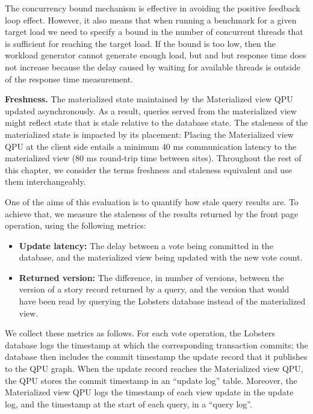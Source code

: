 The concurrency bound mechanism is effective in avoiding the positive feedback loop effect.
However, it also means that when running a benchmark for a given target load we need to specify a bound in the number of
concurrent threads that is sufficient for reaching the target load.
If the bound is too low, then the workload generator cannot generate enough load, but and but response time does not
increase because the delay caused by waiting for available threads is outside of the response time measurement.

\bigskip
\noindent
\textbf{Freshness.} The materialized state maintained by the Materialized view QPU updated asynchronously.
As a result, queries served from the materialized view might reflect state that is stale relative to the database state.
The staleness of the materialized state is impacted by its placement:
Placing the Materialized view QPU at the client side entails a minimum 40 ms communication latency to the materialized view
(80 ms round-trip time between sites).
Throughout the rest of this chapter, we consider the terms freshness and staleness equivalent and use them interchangeably.

One of the aims of this evaluation is to quantify how stale query results are.
To achieve that, we measure the staleness of the results returned by the front page operation,
using the following metrics:
\begin{itemize}
  \item \textbf{Update latency:} The delay between a vote being committed in the database, and the materialized view being
  updated with the new vote count.
  \item \textbf{Returned version:} The difference, in number of versions, between the version of a story record returned by a query,
  and the version that would have been read by querying the Lobsters database instead of the materialized view.
\end{itemize}

We collect these metrics as follows.
For each vote operation, the Lobsters database logs the timestamp at which the corresponding transaction commits;
the database then includes the commit timestamp the update record that it publishes to the QPU graph.
When the update record reaches the Materialized view QPU, the QPU stores the commit timestamp in an
``update log'' table.
Moreover, the Materialized view QPU logs the timestamp of each view update in the update log,
and the timestamp at the start of each query, in a ``query log''.

